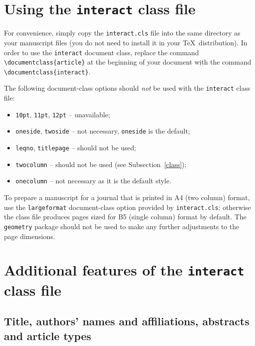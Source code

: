 \documentclass[]{interact}
\theoremstyle{plain}%
\theoremstyle{definition}
\theoremstyle{remark}
\begin{document}
\section{Using the \texttt{interact} class file}

For convenience, simply copy the \texttt{interact.cls} file into the same directory as your manuscript files (you do not need to install it in your \TeX\ distribution). In order to use the \texttt{interact} document class, replace the command \verb"\documentclass{article}" at the beginning of your document with the command \verb"\documentclass{interact}".

The following document-class options should \emph{not} be used with the \texttt{interact} class file:
\begin{itemize}
  \item \texttt{10pt}, \texttt{11pt}, \texttt{12pt} -- unavailable;
  \item \texttt{oneside}, \texttt{twoside} -- not necessary, \texttt{oneside} is the default;
  \item \texttt{leqno}, \texttt{titlepage} -- should not be used;
  \item \texttt{twocolumn} -- should not be used (see Subsection~\ref{class});
  \item \texttt{onecolumn} -- not necessary as it is the default style.
\end{itemize}
To prepare a manuscript for a journal that is printed in A4 (two column) format, use the \verb"largeformat" document-class option provided by \texttt{interact.cls}; otherwise the class file produces pages sized for B5 (single column) format by default. The \texttt{geometry} package should not be used to make any further adjustments to the page dimensions.



\section{Additional features of the \texttt{interact} class file}

\subsection{Title, authors' names and affiliations, abstracts and article types}
\end{document}
